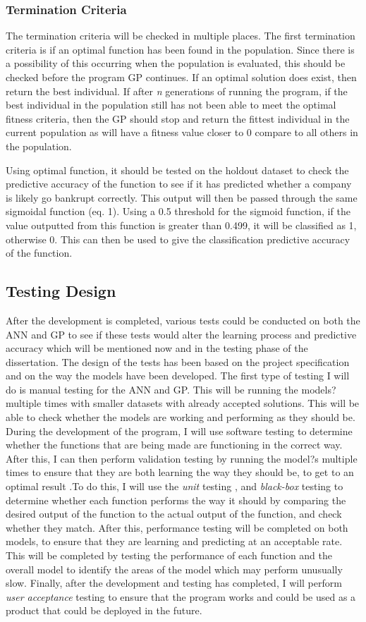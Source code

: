 \documentclass[11pt]{article}
\begin{document}
\subsubsection{Termination Criteria}
The termination criteria will be checked in multiple places. The first termination criteria is if an optimal function has been found in the population. Since there is a possibility of this occurring when the population is evaluated, this should be checked before the program GP continues. If an optimal solution does exist, then return the best individual. If after \textit{n} generations of running the program, if the best individual in the population still has not been able to meet the optimal fitness criteria, then the GP should stop and return the fittest individual in the current population as will have a fitness value closer to 0 compare to all others in the population. 

Using optimal function, it should be tested on the holdout dataset to check the predictive accuracy of the function to see if it has predicted whether a company is likely go bankrupt correctly. This output will then be passed through the same sigmoidal function (eq. 1). Using a 0.5 threshold for the sigmoid function, if the value outputted from this function is greater than 0.499, it will be classified as 1, otherwise 0. This can then be used to give the classification predictive accuracy of the function. 
\subsection{Testing Design}
After the development is completed, various tests could be conducted on both the ANN and GP to see if these tests would alter the learning process and predictive accuracy which will be mentioned now and in the testing phase of the dissertation. The design of the tests has been based on the project specification and on the way the models have been developed. 
The first type of testing I will do is manual testing for the ANN and GP. This will be running  the models? multiple times with smaller datasets with already accepted solutions. This will be able to check whether the models are working and performing as they should be. 
During the development of the program, I will use software testing to determine whether the functions that are being made are functioning in the correct way. After this, I can then perform validation testing by running the model?s multiple times to ensure that they are both learning the way they should be, to get to an optimal result .To do this, I will use the \textit{unit} testing , and \textit{black-box} testing to determine whether each function performs the way it should by comparing the desired output of the function to the actual output of the function, and check whether they match. After this, performance testing will be completed on both models, to ensure that they are learning and predicting at an acceptable rate. This will be completed by testing the performance of each function and the overall model to identify the areas of the model which may perform unusually slow. Finally, after the development and testing has completed, I will perform \textit{user acceptance} testing to ensure that the program works and could be used as a product that could be deployed in the future. 
\end{document}
